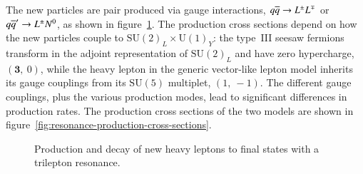 The new particles are pair produced via gauge interactions, $q\overline{q}\rightarrow L^{\pm}L^{\mp}$ or $q\overline{q}'\rightarrow L^{\pm}N^{0}$, as shown in figure~\ref{fig:heavy-lepton-feynman-diagrams}. The production cross sections depend on how the new particles couple to $\mathrm{SU}(2)_L\times \mathrm{U}(1)_Y$: the type~III seesaw fermions transform in the adjoint representation of $\mathrm{SU}(2)_L$ and have zero hypercharge, $(\mathbf{3},\ 0)$, while the heavy lepton in the generic vector-like lepton model inherits its gauge couplings from its $\mathrm{SU}(5)$ multiplet, $(1,\ -1)$.  The different gauge couplings, plus the various production modes, lead to significant differences in production rates. The production cross sections of the two models are shown in figure~\ref{fig:resonance-production-cross-sections}.

\begin{figure}[htbp]
  \centering
  \caption{Production and decay of new heavy leptons to final states with a trilepton resonance.}
  \label{fig:heavy-lepton-feynman-diagrams}
\end{figure}

